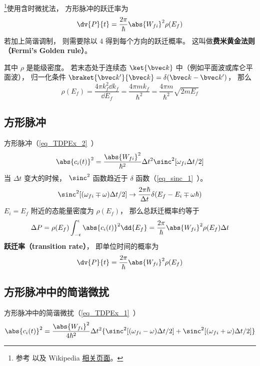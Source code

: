 

\footnote{参考 \cite{Bransden} 以及 Wikipedia \href{https://en.wikipedia.org/wiki/Fermi's_golden_rule}{相关页面}。}使用含时微扰法， 方形脉冲的跃迁率为
\begin{equation} %
\dv{P}{t} = \frac{2\pi}{\hbar} \abs{W_{fi}}^2\rho(E_f)
\end{equation}
若加上简谐调制， 则需要除以 4 得到每个方向的跃迁概率。 这叫做\textbf{费米黄金法则（Fermi's Golden rule）}。

其中 $\rho$ 是能级密度。 若末态处于连续态 $\ket{\bvec k}$ 中（例如平面波或库仑平面波）， 归一化条件 $\braket{\bvec k'}{\bvec k} = \delta(\bvec k - \bvec k')$， 那么
\begin{equation}
\rho(E_f) = \frac{4\pi k_f^2\dd{k_f}}{\dd{E_f}} = \frac{4\pi m k_f}{\hbar^2} = \frac{4\pi m}{\hbar^2}\sqrt{2mE_f}
\end{equation}

\subsection{方形脉冲}
方形脉冲（\autoref{eq_TDPEx_2}~）
\begin{equation}
\abs{c_i(t)}^2 = \frac{\abs{W_{fi}}^2}{\hbar^2} \Delta t^2 \sinc^2[\omega_{fi}\Delta t/2]
\end{equation}
当 $\Delta t$ 变大的时候， $\sinc^2$ 函数趋近于 $\delta$ 函数（\autoref{eq_sinc_1}~）。
\begin{equation}
\sinc^2[(\omega_{fi}\mp\omega)\Delta t/2] \to \frac{2\pi\hbar}{\Delta t}\delta(E_f - E_i \mp \omega\hbar)
\end{equation}
$E_i=E_f$ 附近的态能量密度为 $\rho(E_f)$， 那么总跃迁概率约等于
\begin{equation}
\Delta P = \rho(E_f)\int_{-\epsilon}^{\epsilon}\abs{c_i(t)}^2 \dd{E_f}
= \frac{2\pi}{\hbar} \abs{W_{fi}}^2\rho(E_f)\Delta t
\end{equation}
\textbf{跃迁率（transition rate）}， 即单位时间的概率为
\begin{equation}
\dv{P}{t} = \frac{2\pi}{\hbar} \abs{W_{fi}}^2\rho(E_f)
\end{equation}

\subsection{方形脉冲中的简谐微扰}
方形脉冲中的简谐微扰（\autoref{eq_TDPEx_1}~）
\begin{equation}
\abs{c_i(t)}^2 = \frac{\abs{W_{fi}}^2}{4\hbar^2} \Delta t^2 \{\sinc^2[(\omega_{fi}-\omega)\Delta t/2] + \sinc^2[(\omega_{fi}+\omega)\Delta t/2]\}
\end{equation}

